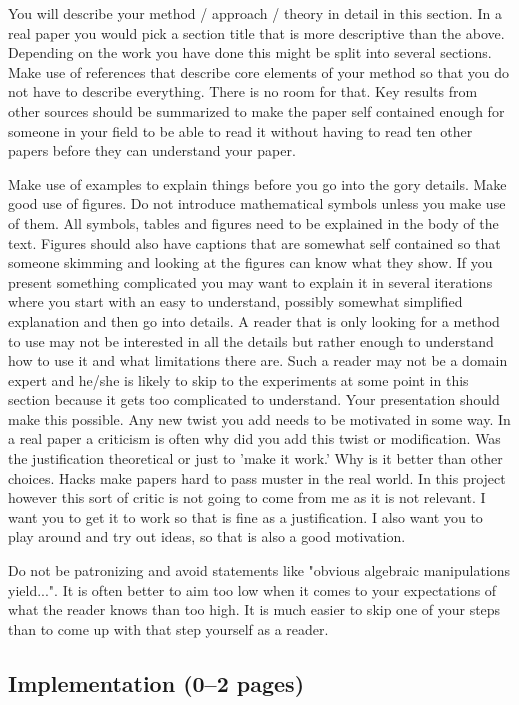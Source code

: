 \documentclass[a4paper,12pt]{article}
\begin{document}
You will describe your method / approach / theory in detail in this
section. In a real paper you would pick a section title that is more
descriptive than the above. Depending on the work you have done this
might be split into several sections. Make use of references that
describe core elements of your method so that you do not have to
describe everything. There is no room for that. Key results from other
sources should be summarized to make the paper self contained enough
for someone in your field to be able to read it without having to read
ten other papers before they can understand your paper.

Make use of examples to explain things before you go into the gory
details. Make good use of figures.  Do not introduce mathematical
symbols unless you make use of them.  All symbols, tables and figures
need to be explained in the body of the text.  Figures should also have
captions that are somewhat self contained so that someone skimming and
looking at the figures can know what they show. If you present
something complicated you may want to explain it in several iterations
where you start with an easy to understand, possibly somewhat
simplified explanation and then go into details. A reader that is only
looking for a method to use may not be interested in all the details
but rather enough to understand how to use it and what limitations
there are. Such a reader may not be a domain expert and he/she is
likely to skip to the experiments at some point in this section
because it gets too complicated to understand. Your presentation
should make this possible.  Any new twist you add needs to be
motivated in some way.  In a real paper a criticism is often why did
you add this twist or modification.  Was the justification theoretical
or just to 'make it work.'  Why is it better than other choices.
Hacks make papers hard to pass muster in the real world.  In this
project however this sort of critic is not going to come from me as it
is not relevant.  I want you to get it to work so that is fine as a
justification.  I also want you to play around and try out ideas, so
that is also a good motivation.

Do not be patronizing and avoid statements like "obvious algebraic
manipulations yield...". It is often better to aim too low when it
comes to your expectations of what the reader knows than too high. It
is much easier to skip one of your steps than to come up with that
step yourself as a reader.

\subsection{Implementation (0--2 pages)}
\end{document}
